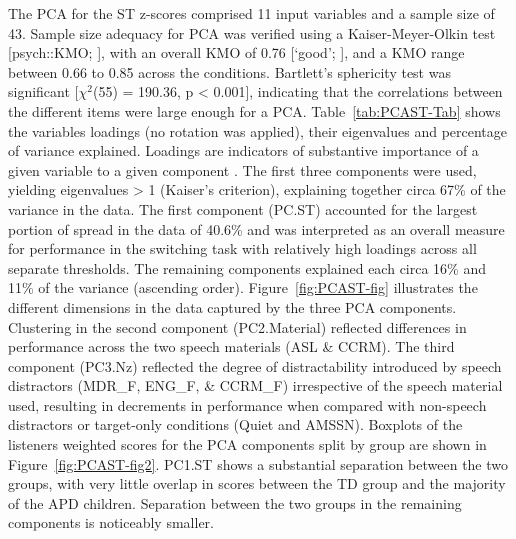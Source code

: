 \documentclass[a4paper, twoside]{templates/ociamthesis}
\begin{document}
The PCA for the ST z-scores comprised 11 input variables and a sample size of 43. Sample size adequacy for PCA was verified using a Kaiser-Meyer-Olkin test {[}psych::KMO; \textcite{psychPackageR}{]}, with an overall KMO of 0.76 {[}`good'; \textcite{Field2012Chpt17}{]}, and a KMO range between 0.66 to 0.85 across the conditions. Bartlett's sphericity test was significant {[}\(\chi^2\)(55) = 190.36, p \textless{} 0.001{]}, indicating that the correlations between the different items were large enough for a PCA. Table~\ref{tab:PCAST-Tab} shows the variables loadings (no rotation was applied), their eigenvalues and percentage of variance explained. Loadings are indicators of substantive importance of a given variable to a given component \autocite{Field2012Chpt17}. The first three components were used, yielding eigenvalues \textgreater{} 1 (Kaiser's criterion), explaining together circa 67\% of the variance in the data. The first component (PC.ST) accounted for the largest portion of spread in the data of 40.6\% and was interpreted as an overall measure for performance in the switching task with relatively high loadings across all separate thresholds. The remaining components explained each circa 16\% and 11\% of the variance (ascending order). Figure~\ref{fig:PCAST-fig} illustrates the different dimensions in the data captured by the three PCA components. Clustering in the second component (PC2.Material) reflected differences in performance across the two speech materials (ASL \& CCRM). The third component (PC3.Nz) reflected the degree of distractability introduced by speech distractors (MDR\_F, ENG\_F, \& CCRM\_F) irrespective of the speech material used, resulting in decrements in performance when compared with non-speech distractors or target-only conditions (Quiet and AMSSN). Boxplots of the listeners weighted scores for the PCA components split by group are shown in Figure~\ref{fig:PCAST-fig2}. PC1.ST shows a substantial separation between the two groups, with very little overlap in scores between the TD group and the majority of the APD children. Separation between the two groups in the remaining components is noticeably smaller.\\
\end{document}
